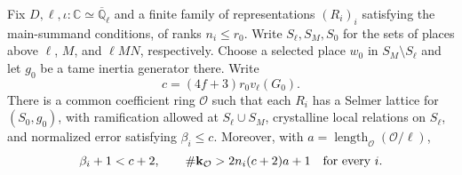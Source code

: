 \begin{lemma}
\label{lem:c-selmer-torsion-level}
\emitthmsource
Fix $D,\ell,\iota\colon\mathbb C\simeq\overline{\mathbb Q}_\ell$ and a finite family of representations $(R_i)_i$ satisfying the main-summand conditions, of ranks $n_i\le r_0$. Write $S_\ell,S_M,S_0$ for the sets of places above $\ell$, $M$, and $\ell MN$, respectively. Choose a selected place $w_0$ in $S_M\setminus S_\ell$ and let $g_0$ be a tame inertia generator there. Write
\[
 c=(4f+3)r_0v_\ell(G_0).
\]
There is a common coefficient ring $\mathcal O$ such that each $R_i$ has a Selmer lattice for $(S_0,g_0)$, with ramification allowed at $S_\ell\cup S_M$, crystalline local relations on $S_\ell$, and normalized error satisfying $\beta_i\le c$. Moreover, with $a=\operatorname{length}_{\mathcal O}(\mathcal O/\ell)$,
\[
 \beta_i+1<c+2,\qquad
 \#\mathbf k_{\mathcal O}>2n_i(c+2)a+1
 \quad\hbox{for every }i.
\]
\end{lemma}
